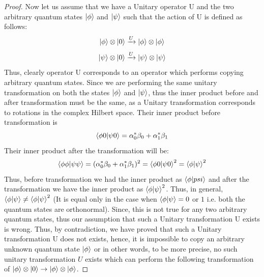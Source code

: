 \begin{proof}
    Now let us assume that we have a Unitary operator U and the two arbitrary quantum states $\ket{\phi}$ and $\ket{\psi}$ such that the action of U is defined as follows:
    \[
    \ket{\phi}\otimes \ket{0} \xrightarrow{U} \ket{\phi}\otimes \ket{\phi}
    \]
    \[
    \ket{\psi}\otimes \ket{0} \xrightarrow{U}\ket{\psi}\otimes \ket{\psi}
    \]
    Thus, clearly operator U corresponds to an operator which performs copying arbitrary quantum states.
    Since we are performing the same unitary transformation on both the states $\ket{\phi}$ and $\ket{\psi}$, thus the inner product before and after transformation must be the same, as a Unitary transformation corresponds to rotations in the complex Hilbert space. Their inner product before transformation is 
    \[
    \braket{\phi0|\psi0}=\alpha^*_0\beta_0+\alpha^*_1\beta_1
    \]
    Their inner product after the transformation will be:
    \[
    \braket{\phi\phi|\psi\psi}=(\alpha^*_0\beta_0+\alpha^*_1\beta_1)^2=\braket{\phi0|\psi0}^2=\braket{\phi|\psi}^2
    \]
    Thus, before transformation we had the inner product as $\braket{\phi|psi}$ and after the transformation we have the inner product as $\braket{\phi|\psi}^2$. Thus, in general, $\braket{\phi|\psi}\neq \braket{\phi|\psi}^2$ (It is equal only in the case when $\braket{\phi|\psi}=0$ or $1$ i.e. both the quantum states are orthonormal). Since, this is not true for any two arbitrary quantum states, thus our assumption that such a Unitary transformation U exists is wrong. Thus, by contradiction, we have proved that such a Unitary transformation U does not exists, hence, it is impossible to copy an arbitrary unknown quantum state $\ket{\phi}$ or in other words, to be more precise, no such unitary transformation $U$ exists which can perform the following transformation of $\ket{\phi} \otimes \ket{0} \rightarrow \ket{\phi} \otimes \ket{\phi}$.
\end{proof}
